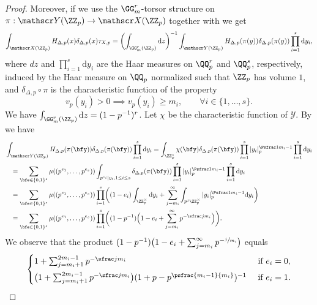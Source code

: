\begin{proof}
Moreover, if we use the $\GG_m^r$-torsor structure on
$\pi:\mathscr Y(\ZZ_p)\to\mathscr X(\ZZ_p)$ together
with \cite[Cor.\,2.23, Prop.\,9.7, 9.13 \& 9.14]{MR1679841} we get
\begin{gather*}
\int_{\mathscr X(\ZZ_p)}H_{\Delta,p}(x)\delta_{\Delta,p} (x) \tau_{X,p}
=\biggl(\int_{\GG_m^r(\ZZ_p)}\mathrm d z\biggr)^{-1}
\int_{\mathscr Y(\ZZ_p)}H_{\Delta,p}(\pi(y))\delta_{\Delta,p} (\pi(y)) \prod_{i=1}^s\mathrm d y_i,
\end{gather*}
where $dz$ and $\prod_{i=1}^s\mathrm d y_i$ are the Haar measures on $\QQ_p^r$ and $\QQ_p^s$,
respectively, induced by the Haar measure on $\QQ_p$ normalized such that $\ZZ_p$ has volume $1$,
and $\delta_{\Delta,p}\circ \pi$ is the characteristic function of the property
\[
v_p(y_i)>0 \implies v_p(y_i)\geq m_i, \qquad \forall i\in\{1,\dots,s\}.
\]
We have $\int_{\GG_m^r(\ZZ_p)}\mathrm d z=(1-p^{-1})^r$.
Let $\chi$ be the characteristic function of $\mathscr Y$. By \cite[Lem.\,11.15]{MR1679841}
we have
\begin{align*}
&\int_{\mathscr Y(\ZZ_p)}H_{\Delta,p}(\pi(\bfy))\delta_{\Delta,p} (\pi(\bfy))
\prod_{i=1}^s\mathrm d y_i
=\int_{\ZZ_p^s}\chi(\bfy)\delta_{\Delta,p} (\pi(\bfy))
\prod_{i=1}^s | y_i |_p^{\Psfrac 1{m_i}-1} \prod_{i=1}^s\mathrm d y_i\\
&\hspace*{3mm}=\sum_{\bfe\in\{0,1\}^s}\mu((p^{e_1},\dots,p^{e_s}))
\int_{p^{e_i}\mid y_i, 1\leq i\leq s}\delta_{\Delta,p} (\pi(\bfy))
\prod_{i=1}^s | y_i |_p^{\Psfrac 1{m_i}-1} \prod_{i=1}^s\mathrm d y_i\\
&\hspace*{3mm}=\sum_{\bfe\in\{0,1\}^s}\mu((p^{e_1},\dots,p^{e_s}))
\prod_{i=1}^s \biggl(
(1-e_i)\int_{\ZZ_p^{\times}}\mathrm d y_i
+ \sum_{j=m_i}^\infty\int_{p^j\ZZ_p^\times}|y_i|_p^{\Psfrac 1{m_i}-1} \mathrm d y_i
\biggr)\\
&\hspace*{3mm}=\sum_{\bfe\in\{0,1\}^s}\mu((p^{e_1},\dots,p^{e_s}))
\prod_{i=1}^s\biggl(
(1-p^{-1})\Bigl(1-e_i +\sum_{j=m_i}^\infty p^{-\sfrac j{m_i}}\Bigr)
\biggr).
\end{align*}
We observe that the product
$(1-p^{-1})\bigl (1-e_i +\sum_{j=m_i}^\infty p^{-\sfrac j{m_i}}\bigr)$ equals
\[
\begin{cases}
1+\sum_{j=m_i+1}^{2m_{i}-1}p^{-\sfrac j{m_i}}
& \text{ if } e_i=0,\\[5pt]
\bigl(1+\sum_{j=m_i+1}^{2m_{i}-1}p^{-\sfrac j{m_i}} \bigr)
(1+p-p^{\psfrac {m_i-1}{m_i}})^{-1}
& \text{ if } e_i=1.
\end{cases}
\]
\end{proof}
